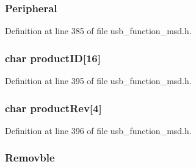 \hypertarget{struct_inquiry_response_aeddc5b07132cbdd62d9d14e6efb88120}{}
\subsubsection[{Peripheral}]{ Peripheral}\label{struct_inquiry_response_aeddc5b07132cbdd62d9d14e6efb88120}


Definition at line 385 of file usb\+\_\+function\+\_\+msd.\+h.

\hypertarget{struct_inquiry_response_a09d7bedbda7e92cd94033f3e5225b71c}{}
\subsubsection[{product\+I\+D}]{\setlength{\rightskip}{0pt plus 5cm}char product\+I\+D\mbox{[}16\mbox{]}}\label{struct_inquiry_response_a09d7bedbda7e92cd94033f3e5225b71c}


Definition at line 395 of file usb\+\_\+function\+\_\+msd.\+h.

\hypertarget{struct_inquiry_response_a65a5a6fbf03ef47f18f56b5f834384a4}{}
\subsubsection[{product\+Rev}]{\setlength{\rightskip}{0pt plus 5cm}char product\+Rev\mbox{[}4\mbox{]}}\label{struct_inquiry_response_a65a5a6fbf03ef47f18f56b5f834384a4}


Definition at line 396 of file usb\+\_\+function\+\_\+msd.\+h.

\hypertarget{struct_inquiry_response_ad590a95ec7dccf9150a3e96582330f07}{}
\subsubsection[{Removble}]{ Removble}\label{struct_inquiry_response_ad590a95ec7dccf9150a3e96582330f07}


